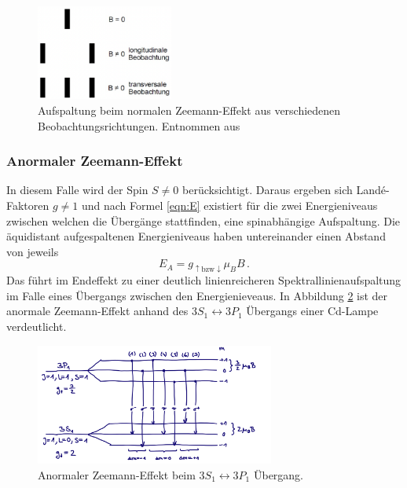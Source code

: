             \begin{figure}[h]
                \centering
                \includegraphics[width = 0.4\textwidth]{pictures/beobachtung.png}
                \caption{Aufspaltung beim normalen Zeemann-Effekt aus verschiedenen Beobachtungsrichtungen. Entnommen aus \cite{haken_atom-_2004}}
                \label{fig:Beob}
            \end{figure}
        \subsubsection{Anormaler Zeemann-Effekt}
            In diesem Falle wird der Spin $S\neq 0$ berücksichtigt.
            Daraus ergeben sich Landé-Faktoren $g\neq 1$ und nach Formel \ref{eqn:E}
            existiert für die zwei Energieniveaus zwischen welchen die Übergänge stattfinden, eine spinabhängige Aufspaltung.
            Die äquidistant aufgespaltenen Energieniveaus haben untereinander einen Abstand von jeweils
            \begin{equation}
                E_A= g_{\uparrow\text{bzw}\downarrow}\mu_BB \, .
            \end{equation}
            Das führt im Endeffekt zu einer deutlich linienreicheren Spektrallinienaufspaltung im Falle eines Übergangs zwischen den Energienieveaus. 
            In Abbildung \ref{fig:ANZ} ist der anormale Zeemann-Effekt anhand des $3S_1\leftrightarrow 3P_1$ Übergangs einer Cd-Lampe verdeutlicht.
            \begin{figure}[h]
                \centering
                \includegraphics[width = 0.7\textwidth]{pictures/anormal.png}
                \caption{Anormaler Zeemann-Effekt beim $3S_1\leftrightarrow 3P_1$ Übergang.}
                \label{fig:ANZ}
            \end{figure}

